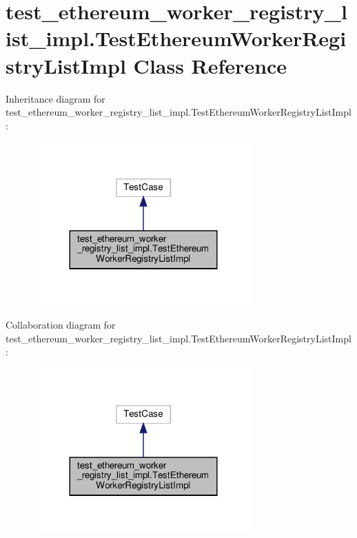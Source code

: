 \hypertarget{classtest__ethereum__worker__registry__list__impl_1_1TestEthereumWorkerRegistryListImpl}{}\section{test\+\_\+ethereum\+\_\+worker\+\_\+registry\+\_\+list\+\_\+impl.\+Test\+Ethereum\+Worker\+Registry\+List\+Impl Class Reference}
\label{classtest__ethereum__worker__registry__list__impl_1_1TestEthereumWorkerRegistryListImpl}


Inheritance diagram for test\+\_\+ethereum\+\_\+worker\+\_\+registry\+\_\+list\+\_\+impl.\+Test\+Ethereum\+Worker\+Registry\+List\+Impl\+:
\nopagebreak
\begin{figure}[H]
\begin{center}
\leavevmode
\includegraphics[width=240pt]{classtest__ethereum__worker__registry__list__impl_1_1TestEthereumWorkerRegistryListImpl__inherit__graph}
\end{center}
\end{figure}


Collaboration diagram for test\+\_\+ethereum\+\_\+worker\+\_\+registry\+\_\+list\+\_\+impl.\+Test\+Ethereum\+Worker\+Registry\+List\+Impl\+:
\nopagebreak
\begin{figure}[H]
\begin{center}
\leavevmode
\includegraphics[width=240pt]{classtest__ethereum__worker__registry__list__impl_1_1TestEthereumWorkerRegistryListImpl__coll__graph}
\end{center}
\end{figure}

